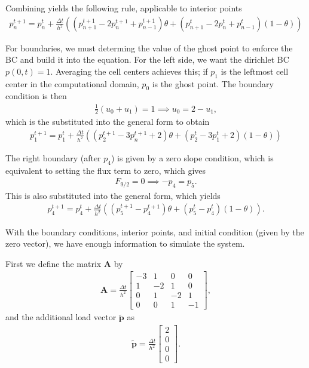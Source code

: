 \documentclass{article}
\begin{document}
Combining yields the following rule, applicable to interior points
\begin{align}
   p_n^{t+1} = p_n^{t} + \frac{\Delta t}{h^2}\left( (p_{n+1}^{t+1} - 2p_n^{t+1} + p_{n-1}^{t+1}) \theta +  (p_{n+1}^{t} - 2p_n^{t} + p_{n-1}^{t}) (1 - \theta) \right)
\end{align}

For boundaries, we must determing the value of the ghost point to enforce the BC and build it into the equation.
For the left side, we want the dirichlet BC $p(0,t) = 1$.
Averaging the cell centers achieves this; if $p_1$ is the leftmost cell center in the computational domain, $p_0$ is the ghost point.
The boundary condition is then
\begin{align}
    \frac{1}{2}(u_0 + u_1) = 1 \implies u_0 = 2 - u_1,
\end{align}
which is the substituted into the general form to obtain
\begin{align}
    p_1^{t+1} = p_1^{t} + \frac{\Delta t}{h^2}\left( (p_{2}^{t+1} - 3p_n^{t+1} + 2) \theta +  (p_{2}^{t} - 3p_1^{t} + 2) (1 - \theta) \right)
\end{align}

The right boundary (after $p_4$) is given by a zero slope condition, which is equivalent to setting the flux term to zero, which gives
\begin{align}
    F_{9/2} = 0 \implies -p_4 = p_5.
\end{align}
This is also substituted into the general form, which yields
\begin{align}
   p_4^{t+1} = p_4^{t} + \frac{\Delta t}{h^2}\left( (p_{5}^{t+1} - p_4^{t+1}) \theta +  (p_{5}^{t} - p_4^{t}) (1 - \theta) \right).
\end{align}

With the boundary conditions, interior points, and initial condition (given by the zero vector), we have enough information to simulate the system.

First we define the matrix $\mathbf{A}$ by
\begin{align}
    \mathbf{A} = \frac{\Delta t}{h^2} \begin{bmatrix}
                    -3 & 1 & 0 & 0 \\
                    1 & -2 & 1 & 0 \\
                    0 & 1 & -2 & 1 \\
                    0 & 0 & 1 & -1
                \end{bmatrix},
\end{align}
and the additional load vector $\tilde{\mathbf{p}}$ as
\begin{align}
\tilde{\mathbf{p}} = \frac{\Delta t}{h^2} \begin{bmatrix}
                    2 \\
                    0 \\
                    0 \\
                    0
                    \end{bmatrix}.
\end{align}
\end{document}
